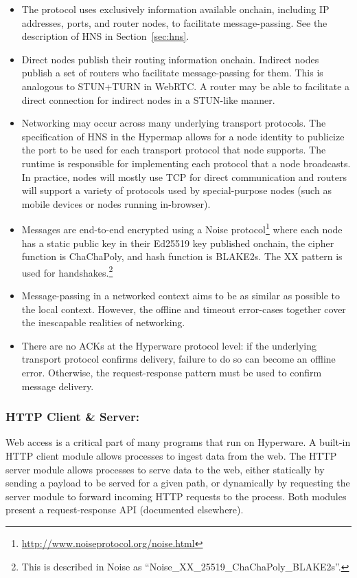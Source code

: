 \documentclass[runningheads]{llncs}
\begin{document}
\begin{itemize}
    \item The protocol uses exclusively information available onchain, including IP addresses, ports, and router nodes, to facilitate message-passing.
    See the description of HNS in Section~\ref{sec:hns}.
    \item Direct nodes publish their routing information onchain.
    Indirect nodes publish a set of routers who facilitate message-passing for them.
    This is analogous to STUN+TURN in WebRTC.
    A router may be able to facilitate a direct connection for indirect nodes in a STUN-like manner.
    \item Networking may occur across many underlying transport protocols.
    The specification of HNS in the Hypermap allows for a node identity to publicize the port to be used for each transport protocol that node supports.
    The runtime is responsible for implementing each protocol that a node broadcasts.
    In practice, nodes will mostly use TCP for direct communication and routers will support a variety of protocols used by special-purpose nodes (such as mobile devices or nodes running in-browser).
    \item Messages are end-to-end encrypted using a Noise protocol\footnote{\url{http://www.noiseprotocol.org/noise.html}}
    where each node has a static public key in their Ed25519 key published onchain, the cipher function is ChaChaPoly, and hash function is BLAKE2s.
    The XX pattern is used for handshakes.\footnote{This is described in Noise as ``Noise\_XX\_25519\_ChaChaPoly\_BLAKE2s''.}
    \item Message-passing in a networked context aims to be as similar as possible to the local context.
    However, the offline and timeout error-cases together cover the inescapable realities of networking.
    \item There are no ACKs at the Hyperware protocol level: if the underlying transport protocol confirms delivery, failure to do so can become an offline error.
    Otherwise, the request-response pattern must be used to confirm message delivery.
\end{itemize}

\subsubsection{HTTP Client \& Server:}
\label{sec:oshttp}

Web access is a critical part of many programs that run on Hyperware.
A built-in HTTP client module allows processes to ingest data from the web.
The HTTP server module allows processes to serve data to the web, either statically by sending a payload to be served for a given path, or dynamically by requesting the server module to forward incoming HTTP requests to the process.
Both modules present a request-response API (documented elsewhere).
\end{document}
